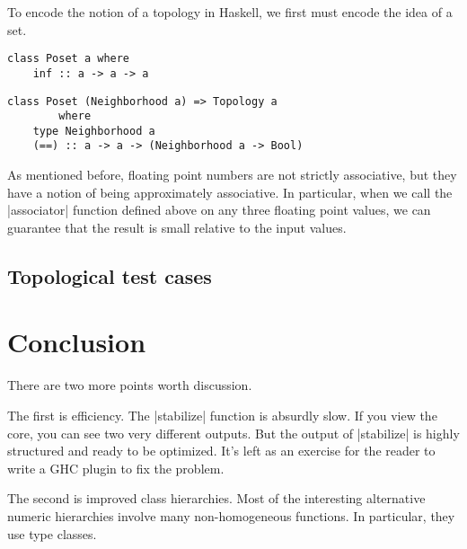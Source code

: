 \documentclass[preprint]{sigplanconf}
\theoremstyle{definition}
\begin{document}
To encode the notion of a topology in Haskell,
we first must encode the idea of a set.

\begin{lstlisting}
class Poset a where
    inf :: a -> a -> a
\end{lstlisting}

\begin{lstlisting}
class Poset (Neighborhood a) => Topology a
        where
    type Neighborhood a
    (==) :: a -> a -> (Neighborhood a -> Bool)
\end{lstlisting}

As mentioned before, floating point numbers are not strictly associative,
but they have a notion of being approximately associative.
In particular, when we call the |associator| function defined above on any three floating point values,
we can guarantee that the result is small relative to the input values.

\subsection{Topological test cases}

\section{Conclusion}

There are two more points worth discussion.

The first is efficiency.
The |stabilize| function is absurdly slow.
If you view the core, you can see two very different outputs.
But the output of |stabilize| is highly structured and ready to be optimized.
It's left as an exercise for the reader to write a GHC plugin to fix the problem.

The second is improved class hierarchies.
Most of the interesting alternative numeric hierarchies involve many non-homogeneous functions.
In particular, they use type classes.



%
%
%
%




\end{document}
